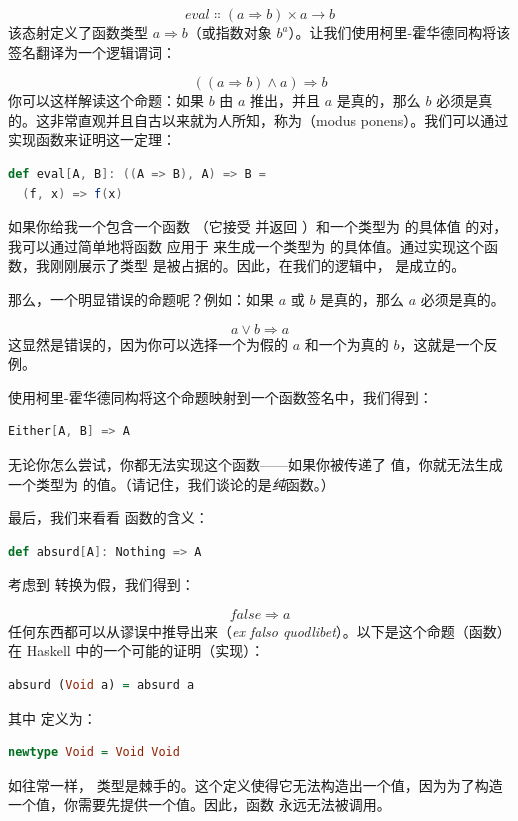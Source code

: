 \[\mathit{eval} \Colon (a \Rightarrow b) \times a \to b\]
该态射定义了函数类型 $a \Rightarrow b$（或指数对象 $b^{a}$）。让我们使用柯里-霍华德同构将该签名翻译为一个逻辑谓词：

\[((a \Rightarrow b) \wedge a) \Rightarrow b\]
你可以这样解读这个命题：如果 $b$ 由 $a$ 推出，并且 $a$ 是真的，那么 $b$ 必须是真的。这非常直观并且自古以来就为人所知，称为（modus ponens）。我们可以通过实现函数来证明这一定理：

\begin{lstlisting}[language=Scala]
def eval[A, B]: ((A => B), A) => B =
  (f, x) => f(x)
\end{lstlisting}
如果你给我一个包含一个函数 （它接受  并返回 ）和一个类型为  的具体值  的对，我可以通过简单地将函数  应用于  来生成一个类型为  的具体值。通过实现这个函数，我刚刚展示了类型  是被占据的。因此，在我们的逻辑中， 是成立的。

那么，一个明显错误的命题呢？例如：如果 $a$ 或 $b$ 是真的，那么 $a$ 必须是真的。

\[a \vee b \Rightarrow a\]
这显然是错误的，因为你可以选择一个为假的 $a$ 和一个为真的 $b$，这就是一个反例。

使用柯里-霍华德同构将这个命题映射到一个函数签名中，我们得到：

\begin{lstlisting}[language=Scala]
Either[A, B] => A
\end{lstlisting}
无论你怎么尝试，你都无法实现这个函数——如果你被传递了  值，你就无法生成一个类型为  的值。（请记住，我们谈论的是\emph{纯}函数。）

最后，我们来看看  函数的含义：

\begin{lstlisting}[language=Scala]
def absurd[A]: Nothing => A
\end{lstlisting}
考虑到  转换为假，我们得到：

\[\mathit{false} \Rightarrow a\]
任何东西都可以从谬误中推导出来（\emph{ex falso quodlibet}）。以下是这个命题（函数）在 Haskell 中的一个可能的证明（实现）：

\begin{lstlisting}[language=Haskell]
  absurd (Void a) = absurd a
\end{lstlisting}
其中  定义为：

\begin{lstlisting}[language=Haskell]
  newtype Void = Void Void
\end{lstlisting}
如往常一样， 类型是棘手的。这个定义使得它无法构造出一个值，因为为了构造一个值，你需要先提供一个值。因此，函数  永远无法被调用。

